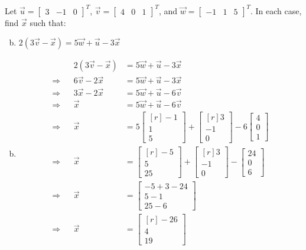 \documentclass[../main.tex]{subfiles}
\begin{document}
Let
$\vec{u} = \begin{bmatrix}3&-1&0\end{bmatrix}^T$,
$\vec{v} = \begin{bmatrix}4&0&1\end{bmatrix}^T$, and
$\vec{w} = \begin{bmatrix}-1&1&5\end{bmatrix}^T$.
In each case, find $\vec{x}$ such that:
\begin{enumerate}[a)]
	\setcounter{enumi}{1}
	\item $2(3\vec{v} - \vec{x}) = 5\vec{w} + \vec{u} - 3\vec{x}$
\end{enumerate}

\solution
\begin{enumerate}[a)]
	\setcounter{enumi}{1}
	\item 
		\begin{align*}
			&& 2(3\vec{v} - \vec{x}) &= 5\vec{w} + \vec{u} - 3\vec{x} \\
			\Rightarrow && 6\vec{v} - 2\vec{x} &= 5\vec{w} + \vec{u} - 3\vec{x} \\
			\Rightarrow && 3\vec{x} - 2\vec{x} &= 5\vec{w} + \vec{u} - 6\vec{v} \\
			\Rightarrow && \vec{x} &= 5\vec{w} + \vec{u} - 6\vec{v} \\
			\Rightarrow && \vec{x} &= 5\begin{bmatrix*}[r]-1\\1\\5\end{bmatrix*} + \begin{bmatrix*}[r]3\\-1\\0\end{bmatrix*} - 6\begin{bmatrix}4\\0\\1\end{bmatrix} \\
			\Rightarrow && \vec{x} &= \begin{bmatrix*}[r]-5\\5\\25\end{bmatrix*} + \begin{bmatrix*}[r]3\\-1\\0\end{bmatrix*} - \begin{bmatrix}24\\0\\6\end{bmatrix} \\
			\Rightarrow && \vec{x} &= \begin{bmatrix}-5 + 3 - 24\\5 - 1\\25 - 6\end{bmatrix} \\
			\Rightarrow && \vec{x} &= \begin{bmatrix*}[r]-26\\4\\19\end{bmatrix*} \\
		\end{align*}
\end{enumerate}
\end{document}

